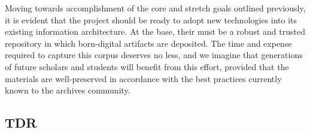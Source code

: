 Moving towards accomplishment of the core and stretch goals outlined previously, it is evident that the project should be ready to adopt new technologies into its existing information architecture. At the base, their must be a robust and trusted repository in which born-digital artifacts are deposited. The time and expense required to capture this corpus deserves no less, and we imagine that generations of future scholars and students will benefit from this effort, provided that the materials are well-preserved in accordance with the best practices currently known to the archives community. 

\subsection{TDR}

